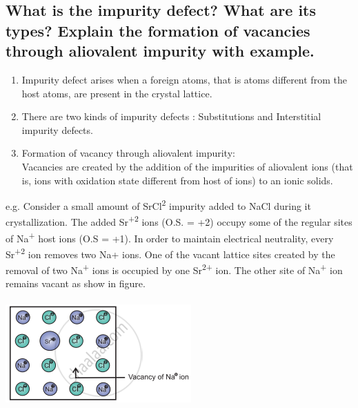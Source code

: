 \documentclass{article}
\begin{document}
   \subsection{What is the impurity defect? What are its types? Explain
   the formation of vacancies through aliovalent impurity with example.}

   \begin{enumerate}
   \item Impurity defect arises when a foreign atoms, that is atoms
   different from the host atoms, are present in the crystal lattice.
   \item There are two kinds of impurity defects : Substitutions and
   Interstitial impurity defects.
   \item Formation of vacancy through aliovalent impurity:\\
   Vacancies are created by the addition of the impurities of
   aliovalent ions (that is, ions with oxidation state different from
   host of ions) to an ionic solids.
   \end{enumerate}

   e.g. Consider a small amount of SrCl\textsuperscript{2} impurity
   added to NaCl during it crystallization. The added 
   Sr\textsuperscript{+2} ions (O.S. = +2) occupy some of the regular
   sites of Na\textsuperscript{+} host ions (O.S = +1). In order to
   maintain electrical neutrality, every Sr\textsuperscript{+2} ion
   removes two Na+ ions. One of the vacant lattice sites created by
   the removal of two Na\textsuperscript{+} ions is occupied by one
   Sr\textsuperscript{2+} ion. The other site of Na\textsuperscript{+}
   ion remains vacant as show in figure.\\\\

   \includegraphics[scale=0.3]{vacan}
\end{document}
